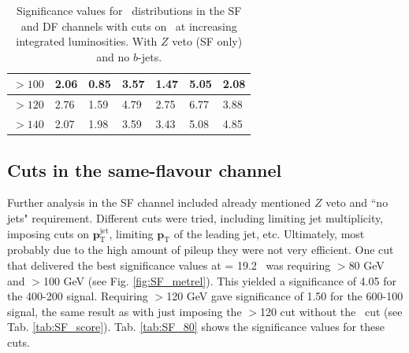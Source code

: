 \begin{table}[H]
\begin{tabular}{|l|llllll}
$>100$   & \multicolumn{1}{l|}{2.06}               & \multicolumn{1}{l|}{0.85}               & \multicolumn{1}{l|}{3.57}               & \multicolumn{1}{l|}{1.47}               & \multicolumn{1}{l|}{5.05}               & \multicolumn{1}{l|}{2.08}               \\ \hline
$>120$    & \multicolumn{1}{l|}{2.76}               & \multicolumn{1}{l|}{1.59}               & \multicolumn{1}{l|}{4.79}               & \multicolumn{1}{l|}{2.75}               & \multicolumn{1}{l|}{6.77}               & \multicolumn{1}{l|}{3.88}               \\ \hline
$>140$    & \multicolumn{1}{l|}{2.07}               & \multicolumn{1}{l|}{1.98}               & \multicolumn{1}{l|}{3.59}               & \multicolumn{1}{l|}{3.43}               & \multicolumn{1}{l|}{5.08}               & \multicolumn{1}{l|}{4.85}               \\ \hline
\end{tabular}
\caption{Significance values for \mttwo \, distributions in the SF and DF channels with cuts on \mttwo \, at increasing integrated luminosities. With $Z$ veto (SF only) and no $b$-jets. }
\label{tab:SF_score_0bjets}
\end{table}

\subsection{Cuts in the same-flavour channel}
Further analysis in the SF channel included already mentioned $Z$ veto and ``no jets" requirement. Different cuts were tried, including limiting jet multiplicity, imposing cuts on 
$\mathbf{p}^{\text{jet}}_{\text{T}}$, limiting $\mathbf{p}_{\text{T}}$ of the leading jet, etc. Ultimately, most probably due to the high amount of pileup they were not very efficient. One cut that delivered the best significance values at \lumi= 19.2 \invfb \, was requiring \metrel$>$80 GeV and \mttwo$>$100 GeV (see Fig. \ref{fig:SF_metrel}). This yielded a significance of 4.05 for the 400-200 signal. Requiring \mttwo$>$120 GeV gave significance of 1.50 for the 600-100 signal, the same result as with just imposing the \mttwo$>$120 cut without the \metrel \, cut (see Tab. \ref{tab:SF_score}). Tab. \ref{tab:SF_80} shows the significance values for these cuts.

